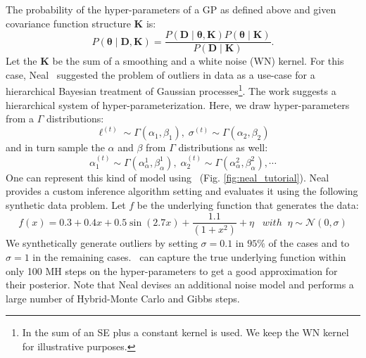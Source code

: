 The probability of the hyper-parameters of a GP as defined above and given covariance function structure $\mathbf{K}$ is:
\begin{equation}
\label{eq:hyperProbability}
P(\bm{\theta} \mid \mathbf{D,K}) = \frac{P(\mathbf{D} \mid \bm{\theta}, \mathbf{K})P(\bm{\theta} \mid  \mathbf{K})}{P(\mathbf{D} \mid \mathbf{K})}.
\end{equation}
Let the $\mathbf{K}$ be the sum of a smoothing and a white noise (WN) kernel. For this case, Neal~\citeyearpar{neal1997monte} suggested the problem of outliers in data as a use-case for a hierarchical Bayesian treatment of Gaussian processes\footnote{In \citep{neal1997monte} the sum of an SE plus a constant kernel is used. We keep the WN kernel for illustrative purposes.}. The work suggests a hierarchical system of hyper-parameterization. Here, we draw hyper-parameters from a $\Gamma$ distributions:
\begin{equation}
\label{eq:hyper-ell}
\ell^{(t)} \sim \Gamma(\alpha_1,\beta_1),\;\sigma^{(t)} \sim \Gamma(\alpha_2,\beta_2)
\end{equation} 
and in turn sample the $\alpha$ and $\beta$ from $\Gamma$ distributions as well:
\begin{equation}
\label{eq:hyper-alpha}
\alpha_1^{(t)} \sim \Gamma(\alpha^1_{\alpha},\beta^1_{ \alpha } ),\; \alpha_2^{(t)} \sim \Gamma(\alpha^2_{\alpha},\beta^2_{\alpha}),\cdots
\end{equation}
One can represent this kind of model using \gpmem\ (Fig. \ref{fig:neal_tutorial}).
Neal provides a custom inference algorithm setting and evaluates it using the following synthetic data problem. Let $f$ be the underlying function that generates the data:
\begin{equation}
f(x) =  0.3 + 0.4 x + 0.5 \sin(2.7x) + \frac{1.1}{(1+ x^2)} + \eta \;\;\; with\;\;\eta \sim \mathcal{N}(0,\sigma)
\end{equation}
We synthetically generate outliers by setting $\sigma = 0.1$ in $95\%$ of the cases and to $\sigma = 1$ in the remaining cases. \gpmem\  can capture the true underlying function within only 100 MH steps on the hyper-parameters to get a good approximation for their posterior. Note that Neal devises an additional noise model and performs a large number of Hybrid-Monte Carlo and Gibbs steps.  
